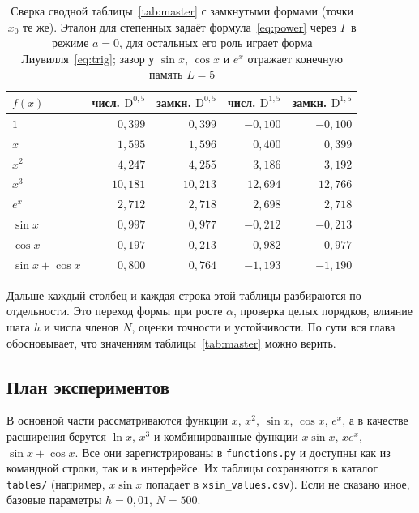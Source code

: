 \documentclass[14pt,a4paper]{extarticle}
\newcommand{\D}{\mathrm{D}}
\begin{document}
\begin{table}[htbp]
\centering
\caption{Сверка сводной таблицы~\ref{tab:master} с замкнутыми формами (точки $x_0$ те же). Эталон для степенных задаёт формула~\eqref{eq:power} через $\Gamma$ в режиме $a=0$, для остальных его роль играет форма Лиувилля~\eqref{eq:trig}; зазор у $\sin x$, $\cos x$ и $e^x$ отражает конечную память $L=5$}
\label{tab:masterref}
\small
\begin{tabular}{|l|r|r|r|r|}
\hline
$f(x)$ & числ. $\D^{0{,}5}$ & замкн. $\D^{0{,}5}$ & числ. $\D^{1{,}5}$ & замкн. $\D^{1{,}5}$ \\
\hline
$1$            & $0{,}399$  & $0{,}399$  & $-0{,}100$ & $-0{,}100$ \\
\hline
$x$            & $1{,}595$  & $1{,}596$  & $0{,}400$  & $0{,}399$ \\
\hline
$x^2$          & $4{,}247$  & $4{,}255$  & $3{,}186$  & $3{,}192$ \\
\hline
$x^3$          & $10{,}181$ & $10{,}213$ & $12{,}694$ & $12{,}766$ \\
\hline
$e^{x}$        & $2{,}712$  & $2{,}718$  & $2{,}698$  & $2{,}718$ \\
\hline
$\sin x$       & $0{,}997$  & $0{,}977$  & $-0{,}212$ & $-0{,}213$ \\
\hline
$\cos x$       & $-0{,}197$ & $-0{,}213$ & $-0{,}982$ & $-0{,}977$ \\
\hline
$\sin x+\cos x$& $0{,}800$  & $0{,}764$  & $-1{,}193$ & $-1{,}190$ \\
\hline
\end{tabular}
\end{table}

Дальше каждый столбец и каждая строка этой таблицы разбираются по отдельности. Это переход формы при росте $\alpha$, проверка целых порядков, влияние шага $h$ и числа членов $N$, оценки точности и устойчивости. По сути вся глава обосновывает, что значениям таблицы~\ref{tab:master} можно верить.

\subsection{План экспериментов}

В основной части рассматриваются функции $x$, $x^2$, $\sin x$, $\cos x$, $e^x$, а в качестве расширения берутся $\ln x$, $x^3$ и комбинированные функции $x\sin x$, $x e^x$, $\sin x+\cos x$. Все они зарегистрированы в \texttt{functions.py} и доступны как из командной строки, так и в интерфейсе. Их таблицы сохраняются в каталог \texttt{tables/} (например, $x\sin x$ попадает в \texttt{xsin\_values.csv}). Если не сказано иное, базовые параметры $h=0{,}01$, $N=500$.
\end{document}
